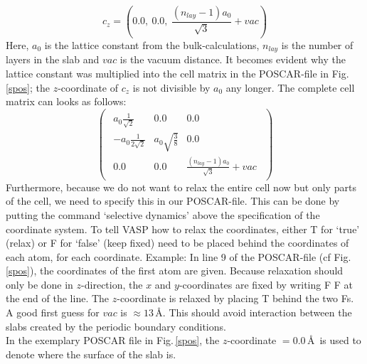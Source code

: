 \documentclass[twoside, 11pt, titlepage, captions=nooneline, a4paper, headsepline]{scrbook}%
\newcommand{\9}{\mathrm}
\newcommand{\0}{\,\mathrm}
\begin{document}
\begin{equation}
c_z= \left(0.0,~0.0,~\frac{(n_{lay}-1)a_0}{\sqrt{3}} + vac\right)
\end{equation}
Here, $a_0$ is the lattice constant from the bulk-calculations, $n_{lay}$ is the number of layers in the slab and $vac$ is the vacuum distance. It becomes evident why the lattice constant was multiplied into the cell matrix in the POSCAR-file in Fig.\,\ref{spos}; the $z$-coordinate of $c_z$ is not divisible by $a_0$ any longer. The complete cell matrix can looks as follows:
\begin{equation}
\begin{pmatrix}\begin{matrix} a_0 \frac{1}{\sqrt{2}} & 0.0 & 0.0 \\ -a_0\frac{1}{2\sqrt{2}} & a_0 \sqrt{\frac{3}{8}} & 0.0 \\0.0 & 0.0 & \frac{(n_{lay}-1)a_0}{\sqrt{3}} + vac \end{matrix} \end{pmatrix}
\end{equation}
Furthermore, because we do not want to relax the entire cell now but only parts of the cell, we need to specify this in our POSCAR-file. This can be done by putting the command `selective dynamics' above the specification of the coordinate system. To tell VASP how to relax the coordinates, either T for `true' (relax) or F for `false' (keep fixed) need to be placed behind the coordinates of each atom, for each coordinate. Example: In line 9 of the POSCAR-file (cf Fig.\,\ref{spos}), the coordinates of the first atom are given. Because relaxation should only be done in $z$-direction, the $x$ and $y$-coordinates are fixed by writing F F at the end of the line. The $z$-coordinate is relaxed by placing T behind the two Fs.\\
A good first guess for $vac$ is $\approx 13$\,\AA. This should avoid interaction between the slabs created by the periodic boundary conditions.\\
In the exemplary POSCAR file in Fig.\,\ref{spos}, the $z$-coordinate $=0.0$\,\AA~is used to denote where the surface of the slab is.\\
\end{document}
